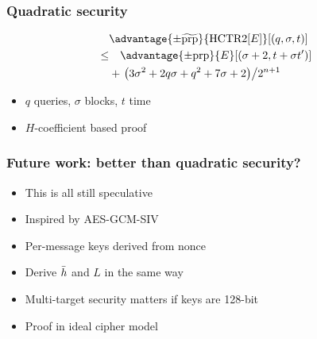 \documentclass[aspectratio=169]{beamer}
\begin{document}
\begin{frame}

    \frametitle{Quadratic security}

    \begin{align*}
        &\advantage{\pm \widetilde{\mathrm{prp}}}{\HCTR[E]}[(q, \sigma, t)] \\
        \leq & \quad \advantage{\pm \mathrm{prp}}{E}[(\sigma + 2, t + \sigma t')] \\
        &+ \left.\left(3\sigma^2 + 2q\sigma + q^2 + 7\sigma + 2\right)\middle/2^{n+1}\right.
    \end{align*}
        

    \begin{itemize}
        \item \(q\) queries, \(\sigma\) blocks, \(t\) time
        \item \(H\)-coefficient based proof
    \end{itemize}
\end{frame}
    
\begin{frame}
\frametitle{Future work: better than quadratic security?}

\begin{itemize}
    \item This is all still speculative
    \item Inspired by AES-GCM-SIV
    \item Per-message keys derived from nonce
    \item Derive \(\bar{h}\) and \(L\) in the same way
    \item Multi-target security matters if keys are 128-bit
    \item Proof in ideal cipher model
\end{itemize}
\end{frame}
\end{document}
